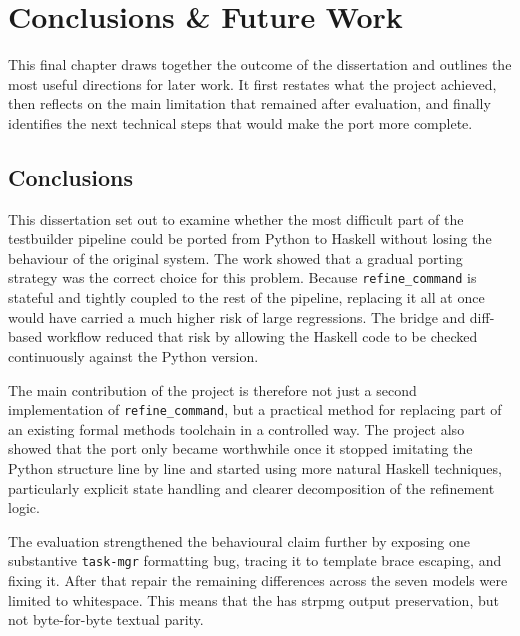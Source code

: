 \chapter{Conclusions \& Future Work}
\label{chap:Conclusions}


This final chapter draws together the outcome of the dissertation and outlines the most useful directions for later work. It first restates what the project achieved, then reflects on the main limitation that remained after evaluation, and finally identifies the next technical steps that would make the port more complete.


\section{Conclusions}

This dissertation set out to examine whether the most difficult part of the testbuilder pipeline could be ported from Python to Haskell without losing the behaviour of the original system. The work showed that a gradual porting strategy was the correct choice for this problem. Because \texttt{refine\_command} is stateful and tightly coupled to the rest of the pipeline, replacing it all at once would have carried a much higher risk of large regressions. The bridge and diff-based workflow reduced that risk by allowing the Haskell code to be checked continuously against the Python version.

The main contribution of the project is therefore not just a second implementation of \texttt{refine\_command}, but a practical method for replacing part of an existing formal methods toolchain in a controlled way. The project also showed that the port only became worthwhile once it stopped imitating the Python structure line by line and started using more natural Haskell techniques, particularly explicit state handling and clearer decomposition of the refinement logic.

The evaluation strengthened the behavioural claim further by exposing one substantive \texttt{task-mgr} formatting bug, tracing it to template brace escaping, and fixing it. After that repair the remaining differences across the seven models were limited to whitespace. This means that the has strpmg output preservation, but not byte-for-byte textual parity.




